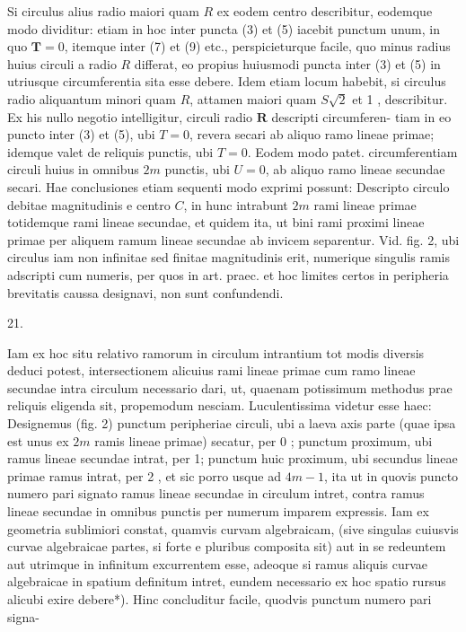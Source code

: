 \documentclass[10pt]{article}
\begin{document}
Si circulus alius radio maiori quam \(R\) ex eodem centro describitur, eodemque modo dividitur: etiam in hoc inter puncta (3) et (5) iacebit punctum unum, in quo \(\boldsymbol{T}=0\), itemque inter (7) et (9) etc., perspicieturque facile, quo minus radius huius circuli a radio \(R\) differat, eo propius huiusmodi puncta inter (3) et (5) in utriusque circumferentia sita esse debere. Idem etiam locum habebit, si circulus radio aliquantum minori quam \(R\), attamen maiori quam \(S \sqrt{2}\) et 1 , describitur. Ex his nullo negotio intelligitur, circuli radio \(\boldsymbol{R}\) descripti circumferen-
tiam in eo puncto inter (3) et (5), ubi \(T=0\), revera secari ab aliquo ramo lineae primae; idemque valet de reliquis punctis, ubi \(T=0\). Eodem modo patet. circumferentiam circuli huius in omnibus \(2 m\) punctis, ubi \(U=0\), ab aliquo ramo lineae secundae secari. Hae conclusiones etiam sequenti modo exprimi possunt: Descripto circulo debitae magnitudinis e centro \(C\), in hunc intrabunt \(2 m\) rami lineae primae totidemque rami lineae secundae, et quidem ita, ut bini rami proximi lineae primae per aliquem ramum lineae secundae ab invicem separentur. Vid. fig. 2, ubi circulus iam non infinitae sed finitae magnitudinis erit, numerique singulis ramis adscripti cum numeris, per quos in art. praec. et hoc limites certos in peripheria brevitatis caussa designavi, non sunt confundendi.

21.

Iam ex hoc situ relativo ramorum in circulum intrantium tot modis diversis deduci potest, intersectionem alicuius rami lineae primae cum ramo lineae secundae intra circulum necessario dari, ut, quaenam potissimum methodus prae reliquis eligenda sit, propemodum nesciam. Luculentissima videtur esse haec: Designemus (fig. 2) punctum peripheriae circuli, ubi a laeva axis parte (quae ipsa est unus ex \(2 m\) ramis lineae primae) secatur, per 0 ; punctum proximum, ubi ramus lineae secundae intrat, per 1; punctum huic proximum, ubi secundus lineae primae ramus intrat, per 2 , et sic porro usque ad \(4 m-1\), ita ut in quovis puncto numero pari signato ramus lineae secundae in circulum intret, contra ramus lineae secundae in omnibus punctis per numerum imparem expressis. Iam ex geometria sublimiori constat, quamvis curvam algebraicam, (sive singulas cuiusvis curvae algebraicae partes, si forte e pluribus composita sit) aut in se redeuntem aut utrimque in infinitum excurrentem esse, adeoque si ramus aliquis curvae algebraicae in spatium definitum intret, eundem necessario ex hoc spatio rursus alicubi exire debere*). Hinc concluditur facile, quodvis punctum numero pari signa-
\end{document}
